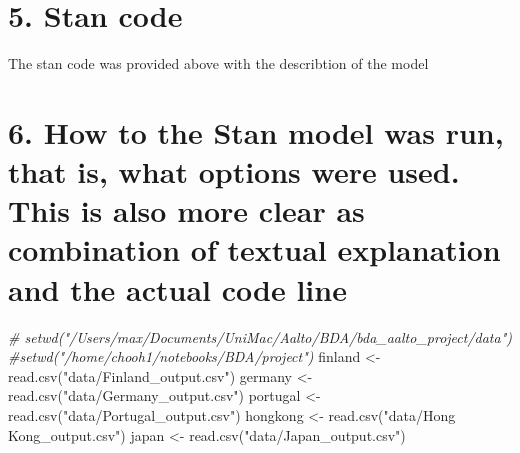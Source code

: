 \documentclass[
]{article}
\newenvironment{Shaded}{\begin{snugshade}}{\end{snugshade}}
\newcommand{\AttributeTok}[1]{\textcolor[rgb]{0.77,0.63,0.00}{#1}}
\newcommand{\CommentTok}[1]{\textcolor[rgb]{0.56,0.35,0.01}{\textit{#1}}}
\newcommand{\FunctionTok}[1]{\textcolor[rgb]{0.00,0.00,0.00}{#1}}
\newcommand{\NormalTok}[1]{#1}
\newcommand{\OtherTok}[1]{\textcolor[rgb]{0.56,0.35,0.01}{#1}}
\newcommand{\SpecialCharTok}[1]{\textcolor[rgb]{0.00,0.00,0.00}{#1}}
\newcommand{\StringTok}[1]{\textcolor[rgb]{0.31,0.60,0.02}{#1}}
\begin{document}
\hypertarget{stan-code}{%
\section{5. Stan code}\label{stan-code}}

The stan code was provided above with the describtion of the model

\hypertarget{how-to-the-stan-model-was-run-that-is-what-options-were-used.-this-is-also-more-clear-as-combination-of-textual-explanation-and-the-actual-code-line}{%
\section{6. How to the Stan model was run, that is, what options were
used. This is also more clear as combination of textual explanation and
the actual code
line}\label{how-to-the-stan-model-was-run-that-is-what-options-were-used.-this-is-also-more-clear-as-combination-of-textual-explanation-and-the-actual-code-line}}

\begin{Shaded}
\begin{Highlighting}[]
\CommentTok{\# setwd("/Users/max/Documents/UniMac/Aalto/BDA/bda\_aalto\_project/data")}
\CommentTok{\#setwd("/home/chooh1/notebooks/BDA/project")}
\NormalTok{finland }\OtherTok{\textless{}{-}} \FunctionTok{read.csv}\NormalTok{(}\StringTok{"data/Finland\_output.csv"}\NormalTok{)}
\NormalTok{germany }\OtherTok{\textless{}{-}} \FunctionTok{read.csv}\NormalTok{(}\StringTok{"data/Germany\_output.csv"}\NormalTok{)}
\NormalTok{portugal }\OtherTok{\textless{}{-}} \FunctionTok{read.csv}\NormalTok{(}\StringTok{"data/Portugal\_output.csv"}\NormalTok{)}
\NormalTok{hongkong }\OtherTok{\textless{}{-}} \FunctionTok{read.csv}\NormalTok{(}\StringTok{"data/Hong Kong\_output.csv"}\NormalTok{)}
\NormalTok{japan }\OtherTok{\textless{}{-}} \FunctionTok{read.csv}\NormalTok{(}\StringTok{"data/Japan\_output.csv"}\NormalTok{)}
\end{Highlighting}
\end{Shaded}

\begin{Shaded}
\end{Shaded}
\end{document}

